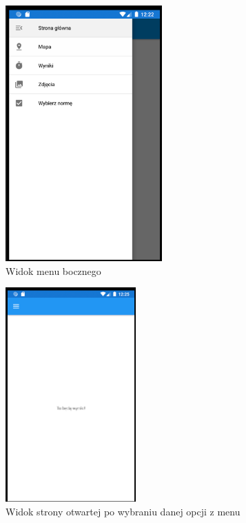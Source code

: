 \begin{figure}[!htb]
	\begin{center}
		\includegraphics[width=6cm]{rys/ZSmenu.png}
		\caption{Widok menu bocznego}
		\label{rys:rysunek007}
	\end{center}
\end{figure}
\newline \newline
\begin{figure}[!htb]
	\begin{center}
		\includegraphics[width=5cm]{rys/ZSotwartastrona.png}
		\caption{Widok strony otwartej po wybraniu danej opcji z menu}
		\label{rys:rysunek008}
	\end{center}
\end{figure}
 \newpage


